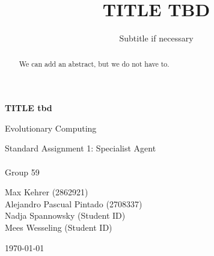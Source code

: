 \documentclass[sigconf,nonacm]{acmart}
\begin{document}
\begin{titlepage}
    \centering
    \vspace*{1cm}

    \Huge
    \textbf{TITLE tbd}

    \vspace{0.5cm}
    \LARGE
    Evolutionary Computing

    \vspace{1.5cm}
    Standard Assignment 1: Specialist Agent \\ \\
    Group 59

    \vspace{1.5cm}
    Max Kehrer (2862921)\\
    Alejandro Pascual Pintado (2708337)\\
    Nadja Spannowsky (Student ID)\\
    Mees Wesseling (Student ID)

    \vspace{1.5cm}
    \today

    \vfill
\end{titlepage}

\title{TITLE TBD}
\subtitle{Subtitle if necessary}

\begin{abstract}
We can add an abstract, but we do not have to.
\end{abstract}


\maketitle



\clearpage

%

\end{document}
